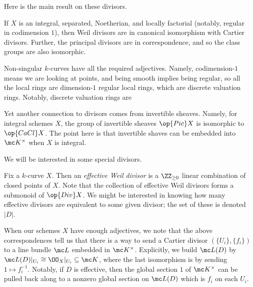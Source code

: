 \documentclass[../notes.tex]{subfiles}
\begin{document}
Here is the main result on these divisors.
\begin{proposition}
	If $X$ is an integral, separated, Noetherian, and locally factorial (notably, regular in codimension $1$), then Weil divisors are in canonical isomorphism with Cartier divisors. Further, the principal divisors are in correspondence, and so the class groups are also isomorphic.
\end{proposition}
\begin{example}
	Non-singular $k$-curves have all the required adjectives. Namely, codimension-$1$ means we are looking at points, and being smooth implies being regular, so all the local rings are dimension-$1$ regular local rings, which are discrete valuation rings. Notably, discrete valuation rings are
\end{example}
Yet another connection to divisors comes from invertible sheaves. Namely, for integral schemes $X$, the group of invertible sheaves $\op{Pic}X$ is isomorphic to $\op{CaCl}X$. The point here is that invertible shaves can be embedded into $\mc K^\times$ when $X$ is integral.

We will be interested in some special divisors.
\begin{definition}[effective]
	Fix a $k$-curve $X$. Then an \textit{effective Weil divisor} is a $\ZZ_{\ge0}$ linear combination of closed points of $X$. Note that the collection of effective Weil divisors forms a submonoid of $\op{Div}X$. We might be interested in knowing how many effective divisors are equivalent to some given divisor; the set of these is denoted $|D|$.
\end{definition}
When our schemes $X$ have enough adjectives, we note that the above correspondences tell us that there is a way to send a Cartier divisor $(\{U_i\},\{f_i\})$ to a line bundle $\mc L$ embedded in $\mc K^\times$. Explicitly, we build $\mc L(D)$ by $\mc L(D)|_{U_i}\cong\OO_X|_{U_i}\subseteq\mc K$, where the last isomorphism is by sending $1\mapsto f_i^{-1}$. Notably, if $D$ is effective, then the global section $1$ of $\mc K^\times$ can be pulled back along to a nonzero global section on $\mc L(D)$ which is $f_i$ on each $U_i$.
\end{document}

